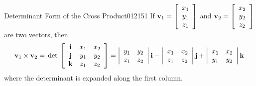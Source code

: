 \begin{theorem*}{Determinant Form of the Cross Product}{012151}
If 
$\textbf{v}_{1}= \left[
\begin{array}{c}
x_{1}\\
y_{1}\\
z_{1}
\end{array}
\right]$
and 
$\textbf{v}_{2}= \left[
\begin{array}{c}
x_{2}\\
y_{2}\\
z_{2}
\end{array}
\right]$
 are two vectors, then
\begin{equation*}
\textbf{v}_{1} \times \textbf{v}_{2} = \thinspace\operatorname{det\medspace}\left[
\begin{array}{ccc}
\textbf{i} & x_{1} & x_{2}\\
\textbf{j} & y_{1} & y_{2}\\
\textbf{k} & z_{1} & z_{2}
\end{array}
\right]
=
\left|
\begin{array}{cc}
y_{1} & y_{2}\\
z_{1} & z_{2}
\end{array}
\right|\textbf{i}
-
\left|
\begin{array}{cc}
x_{1} & x_{2}\\
z_{1} & z_{2}
\end{array}
\right|\textbf{j}
+
\left|
\begin{array}{cc}
x_{1} & x_{2}\\
y_{1} & y_{2}
\end{array}
\right|\textbf{k}
\end{equation*}
where the determinant is expanded along the first column.
\end{theorem*} 


